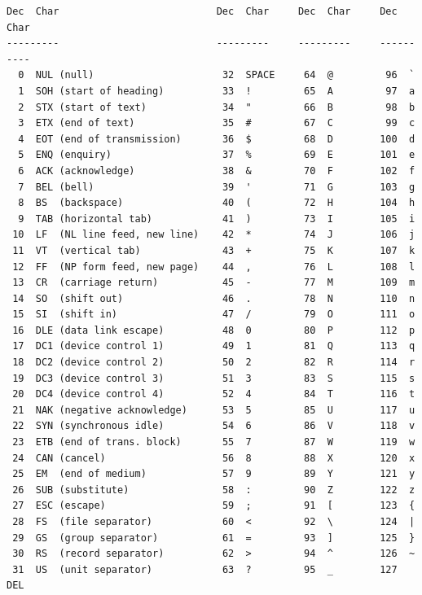 \documentclass{article}
\begin{document}
\begin{lstlisting}
Dec  Char                           Dec  Char     Dec  Char     Dec  Char
---------                           ---------     ---------     ----------
  0  NUL (null)                      32  SPACE     64  @         96  `
  1  SOH (start of heading)          33  !         65  A         97  a
  2  STX (start of text)             34  "         66  B         98  b
  3  ETX (end of text)               35  #         67  C         99  c
  4  EOT (end of transmission)       36  $         68  D        100  d
  5  ENQ (enquiry)                   37  %         69  E        101  e
  6  ACK (acknowledge)               38  &         70  F        102  f
  7  BEL (bell)                      39  '         71  G        103  g
  8  BS  (backspace)                 40  (         72  H        104  h
  9  TAB (horizontal tab)            41  )         73  I        105  i
 10  LF  (NL line feed, new line)    42  *         74  J        106  j
 11  VT  (vertical tab)              43  +         75  K        107  k
 12  FF  (NP form feed, new page)    44  ,         76  L        108  l
 13  CR  (carriage return)           45  -         77  M        109  m
 14  SO  (shift out)                 46  .         78  N        110  n
 15  SI  (shift in)                  47  /         79  O        111  o
 16  DLE (data link escape)          48  0         80  P        112  p
 17  DC1 (device control 1)          49  1         81  Q        113  q
 18  DC2 (device control 2)          50  2         82  R        114  r
 19  DC3 (device control 3)          51  3         83  S        115  s
 20  DC4 (device control 4)          52  4         84  T        116  t
 21  NAK (negative acknowledge)      53  5         85  U        117  u
 22  SYN (synchronous idle)          54  6         86  V        118  v
 23  ETB (end of trans. block)       55  7         87  W        119  w
 24  CAN (cancel)                    56  8         88  X        120  x
 25  EM  (end of medium)             57  9         89  Y        121  y
 26  SUB (substitute)                58  :         90  Z        122  z
 27  ESC (escape)                    59  ;         91  [        123  {
 28  FS  (file separator)            60  <         92  \        124  |
 29  GS  (group separator)           61  =         93  ]        125  }
 30  RS  (record separator)          62  >         94  ^        126  ~
 31  US  (unit separator)            63  ?         95  _        127  DEL
\end{lstlisting}
\end{document}
